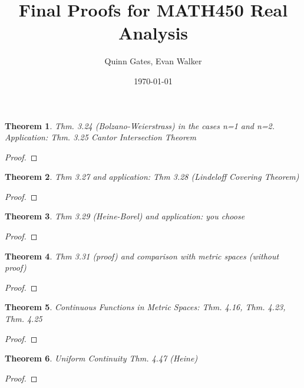 \documentclass[aps,pra,notitlepage,amsmath,amssymb,letterpaper,12pt]{revtex4-1}
\newtheorem{theorem}{Theorem}
\begin{document}
\title{Final Proofs for MATH450 Real Analysis}
\author{Quinn Gates, Evan Walker}
\date{\today}

\maketitle


\begin{theorem}
Thm. 3.24 (Bolzano-Weierstrass) in the cases n=1 and n=2. Application: Thm. 3.25 Cantor Intersection Theorem
\end{theorem}

\begin{proof}
\end{proof}


\begin{theorem}
Thm 3.27 and application: Thm 3.28 (Lindeloff Covering Theorem)
\end{theorem}

\begin{proof}
\end{proof}


\begin{theorem}
Thm 3.29 (Heine-Borel) and application: you choose
\end{theorem}

\begin{proof}
\end{proof}


\begin{theorem}
Thm 3.31 (proof) and comparison with metric spaces (without proof)
\end{theorem}

\begin{proof}
\end{proof}


\begin{theorem}
Continuous Functions in Metric Spaces: Thm. 4.16, Thm. 4.23, Thm. 4.25
\end{theorem}

\begin{proof}
\end{proof}


\begin{theorem}
Uniform Continuity Thm. 4.47 (Heine)
\end{theorem}

\begin{proof}
\end{proof}
\end{document}
